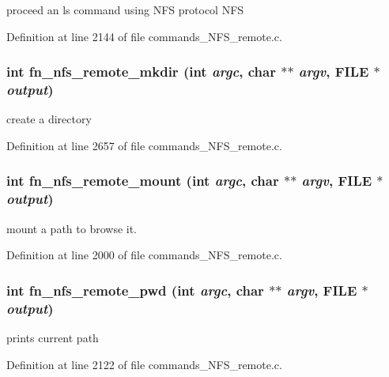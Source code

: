 proceed an ls command using NFS protocol NFS 

Definition at line 2144 of file commands\_\-NFS\_\-remote.c.
\subsubsection[{fn\_\-nfs\_\-remote\_\-mkdir}]{\setlength{\rightskip}{0pt plus 5cm}int fn\_\-nfs\_\-remote\_\-mkdir (int {\em argc}, \/  char $\ast$$\ast$ {\em argv}, \/  FILE $\ast$ {\em output})}\label{commands__NFS__remote_8c_2b93fc9c178407b8be3340c2d2b9463d}


create a directory 

Definition at line 2657 of file commands\_\-NFS\_\-remote.c.
\subsubsection[{fn\_\-nfs\_\-remote\_\-mount}]{\setlength{\rightskip}{0pt plus 5cm}int fn\_\-nfs\_\-remote\_\-mount (int {\em argc}, \/  char $\ast$$\ast$ {\em argv}, \/  FILE $\ast$ {\em output})}\label{commands__NFS__remote_8c_2fa932d8573b9d9cf1b25a1515750cfa}


mount a path to browse it. 

Definition at line 2000 of file commands\_\-NFS\_\-remote.c.
\subsubsection[{fn\_\-nfs\_\-remote\_\-pwd}]{\setlength{\rightskip}{0pt plus 5cm}int fn\_\-nfs\_\-remote\_\-pwd (int {\em argc}, \/  char $\ast$$\ast$ {\em argv}, \/  FILE $\ast$ {\em output})}\label{commands__NFS__remote_8c_711fe3c372610defb306bfd74d66dca4}


prints current path 

Definition at line 2122 of file commands\_\-NFS\_\-remote.c.
